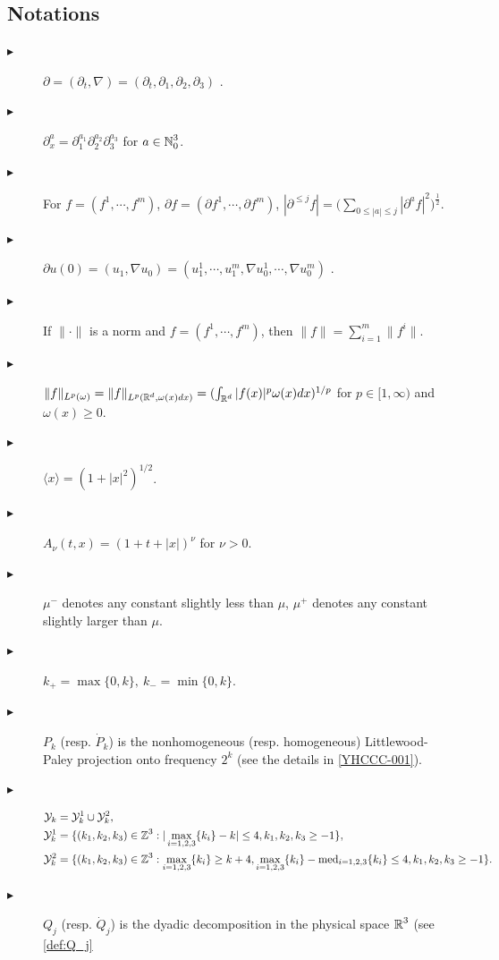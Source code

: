 \documentclass[11pt,twoside]{article}
\def\cY{\mathcal Y}
\def\N{\mathop{\mathbb N\kern 0pt}\nolimits}
\def\Z{\mathop{\mathbb Z\kern 0pt}\nolimits}
\def\R{\mathop{\mathbb R\kern 0pt}\nolimits}
\def\ds{\displaystyle}
\def\p{\partial}
\newcommand{\w}[1]{\langle {#1} \rangle}
\newcommand{\pk}{\dot{P}_k}
\newcommand{\Pk}{P_k}
\newcommand{\q}{\dot{Q}}
\theoremstyle{plain}
\theoremstyle{definition}
\numberwithin{equation}{section}
\begin{document}
\subsection{Notations}
\begin{description}
	\item [$\blacktriangleright $]$\p = (\p_t,\nabla) = (\p_t,\p_1,\p_2,\p_3)$ .
	\item [$\blacktriangleright $]$\p_x^a =\p_1^{a_1}\p_2^{a_2}\p_3^{a_3}$ for $a\in \N_0^3$.
	\item [$\blacktriangleright $]For $f = (f^1,\cdots,f^m)$, $\p f=   (\p f^1,\cdots,\p f^m)$, $\ds|\p^{\le j}f|=\big(\sum_{0\le|a|
           \le j}|\p^af|^2\big)^\frac12$.
	\item [$\blacktriangleright $]$\p u(0) = (u_1,\nabla u_0) = (u_1^1,\cdots,u_1^m,\nabla u_0^1,\cdots,\nabla u_0^m)$ .
	\item [$\blacktriangleright $]If $\|\cdot\|$ is a norm and $f = (f^1,\cdots,f^m)$, then $\|f\|=\ds\sum_{i=1}^{m}\|f^i\|$.
	\item [$\blacktriangleright $] $\|f\|_{L^p(\omega)}=\|f\|_{L^p(\R^d,\omega(x)dx)} = (\int_{\R^d} |f(x)|^p\omega(x)dx)^{1/p}$ for $p \in [1,\infty)$ and $\omega(x)\ge 0$.
	\item [$\blacktriangleright $]$\w{x}= (1+|x|^2)^{1/2}$.
	\item [$\blacktriangleright $]$A_{\nu}(t,x)=(1+t+|x|)^\nu$ for $\nu>0$.
	\item [$\blacktriangleright $]$\mu^-$ denotes any constant slightly less than $\mu$, $\mu^+$ denotes any constant slightly larger than $\mu$.
	\item [$\blacktriangleright $]$k_+=\max\{0,k\},\ k_-=\min\{0,k\}$.
	\item [$\blacktriangleright $]$\Pk$ (resp. $\pk$) is the nonhomogeneous (resp. homogeneous) Littlewood-Paley projection onto frequency $2^k$ (see the details in \eqref{YHCCC-001}).
	\item [$\blacktriangleright $] \begin{equation*}
		\begin{split}
			\cY_k&=\cY_k^1\cup\cY_k^2,\\
			\cY_k^1&=\{(k_1,k_2,k_3)\in\Z^3: |\max_{i=1,2,3}\{k_i\}-k|\le4,k_1,k_2,k_3\ge-1\},\\
			\cY_k^2&=\{(k_1,k_2,k_3)\in\Z^3: \max_{i=1,2,3}\{k_i\}\ge k+4,
			\max_{i=1,2,3}\{k_i\}-{\rm med}_{i=1,2,3}\{k_i\}\le4,k_1,k_2,k_3\ge-1\}.
		\end{split}
	\end{equation*}
	\item [$\blacktriangleright $]$Q_j$ (resp. $\q_j$) is the dyadic decomposition in the physical space $\R^3$ (see \eqref{def:Q_j}

\end{description}
\end{document}
